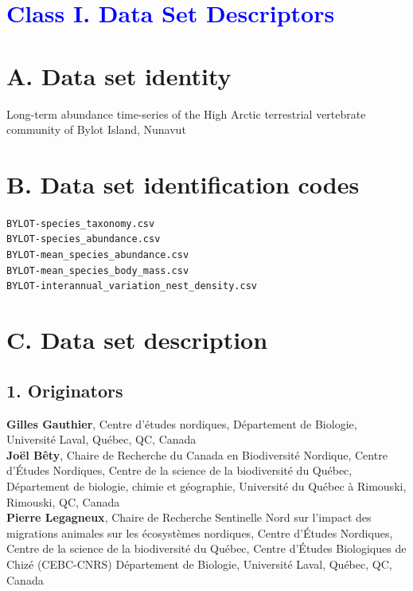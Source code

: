 \documentclass[a4paper,twoside,10pt]{article}
\begin{document}
\section*{\textcolor{Blue}{Class I. Data Set Descriptors}}
    \section*{A. Data set identity} Long-term abundance time-series of the High Arctic terrestrial vertebrate community of Bylot Island, Nunavut
    \section*{B. Data set identification codes}
     \texttt{BYLOT-species\_taxonomy.csv}\\
     \texttt{BYLOT-species\_abundance.csv}\\
     \texttt{BYLOT-mean\_species\_abundance.csv}\\
     \texttt{BYLOT-mean\_species\_body\_mass.csv}\\
     \texttt{BYLOT-interannual\_variation\_nest\_density.csv}\\
     
    \section*{C. Data set description}
		\subsection*{1. Originators}
		\textbf{Gilles Gauthier}, Centre d’études nordiques, Département de Biologie, Université Laval, Québec, QC, Canada\\
  		\textbf{Joël Bêty},  Chaire de Recherche du Canada en Biodiversité Nordique, Centre d’Études Nordiques, Centre de la science de la biodiversité du Québec, Département de biologie, chimie et géographie, Université du Québec à Rimouski, Rimouski, QC, Canada \\
  		\textbf{Pierre Legagneux}, Chaire de Recherche Sentinelle Nord sur l’impact des migrations animales sur les écosystèmes nordiques, Centre d’Études Nordiques, Centre de la science de la biodiversité du Québec, Centre d’Études Biologiques de Chizé (CEBC-CNRS) Département de Biologie, Université Laval, Québec, QC, Canada
  		
\end{document}
